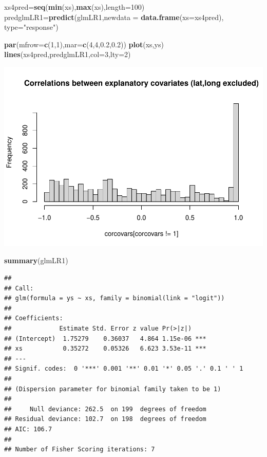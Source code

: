 \documentclass[
]{book}
\newenvironment{Shaded}{\begin{snugshade}}{\end{snugshade}}
\newcommand{\AttributeTok}[1]{\textcolor[rgb]{0.13,0.29,0.53}{#1}}
\newcommand{\DecValTok}[1]{\textcolor[rgb]{0.00,0.00,0.81}{#1}}
\newcommand{\FloatTok}[1]{\textcolor[rgb]{0.00,0.00,0.81}{#1}}
\newcommand{\FunctionTok}[1]{\textcolor[rgb]{0.13,0.29,0.53}{\textbf{#1}}}
\newcommand{\NormalTok}[1]{#1}
\newcommand{\OtherTok}[1]{\textcolor[rgb]{0.56,0.35,0.01}{#1}}
\newcommand{\StringTok}[1]{\textcolor[rgb]{0.31,0.60,0.02}{#1}}
\begin{document}
\begin{Shaded}
\begin{Highlighting}[]
\NormalTok{xs4pred}\OtherTok{=}\FunctionTok{seq}\NormalTok{(}\FunctionTok{min}\NormalTok{(xs),}\FunctionTok{max}\NormalTok{(xs),}\AttributeTok{length=}\DecValTok{100}\NormalTok{)}
\NormalTok{predglmLR1}\OtherTok{=}\FunctionTok{predict}\NormalTok{(glmLR1,}\AttributeTok{newdata =} \FunctionTok{data.frame}\NormalTok{(}\AttributeTok{xs=}\NormalTok{xs4pred),}
\AttributeTok{type=}\StringTok{"response"}\NormalTok{)}

\FunctionTok{par}\NormalTok{(}\AttributeTok{mfrow=}\FunctionTok{c}\NormalTok{(}\DecValTok{1}\NormalTok{,}\DecValTok{1}\NormalTok{),}\AttributeTok{mar=}\FunctionTok{c}\NormalTok{(}\DecValTok{4}\NormalTok{,}\DecValTok{4}\NormalTok{,}\FloatTok{0.2}\NormalTok{,}\FloatTok{0.2}\NormalTok{))}
\FunctionTok{plot}\NormalTok{(xs,ys)}
\FunctionTok{lines}\NormalTok{(xs4pred,predglmLR1,}\AttributeTok{col=}\DecValTok{3}\NormalTok{,}\AttributeTok{lty=}\DecValTok{2}\NormalTok{)}
\end{Highlighting}
\end{Shaded}

\includegraphics{ECOMODbook_files/figure-latex/unnamed-chunk-23-1.pdf}

\begin{Shaded}
\begin{Highlighting}[]
\FunctionTok{summary}\NormalTok{(glmLR1)}
\end{Highlighting}
\end{Shaded}

\begin{verbatim}
## 
## Call:
## glm(formula = ys ~ xs, family = binomial(link = "logit"))
## 
## Coefficients:
##             Estimate Std. Error z value Pr(>|z|)    
## (Intercept)  1.75279    0.36037   4.864 1.15e-06 ***
## xs           0.35272    0.05326   6.623 3.53e-11 ***
## ---
## Signif. codes:  0 '***' 0.001 '**' 0.01 '*' 0.05 '.' 0.1 ' ' 1
## 
## (Dispersion parameter for binomial family taken to be 1)
## 
##     Null deviance: 262.5  on 199  degrees of freedom
## Residual deviance: 102.7  on 198  degrees of freedom
## AIC: 106.7
## 
## Number of Fisher Scoring iterations: 7
\end{verbatim}
\end{document}
